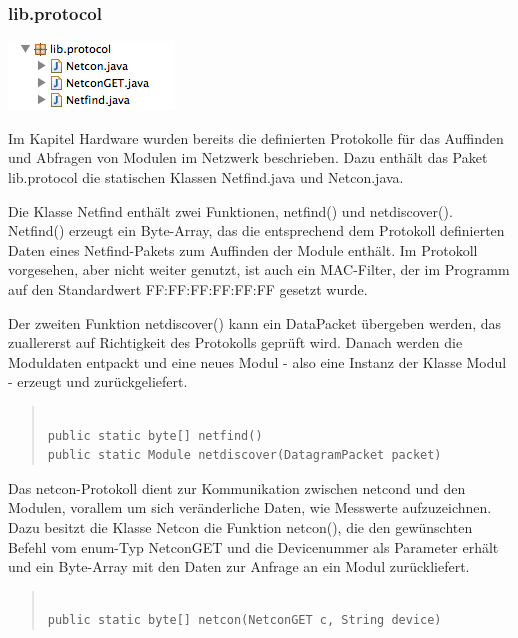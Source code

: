 \documentclass[a4paper,14pt,headsepline]{scrartcl}
\begin{document}
\subsubsection*{lib.protocol}

\includegraphics[width=0.2 \paperwidth]{./bilder/lib_protocol.png}

Im Kapitel Hardware wurden bereits die definierten Protokolle für das Auffinden und Abfragen von Modulen im Netzwerk beschrieben. Dazu enthält das Paket lib.protocol die statischen Klassen Netfind.java und Netcon.java. 

Die Klasse Netfind enthält zwei Funktionen, netfind() und netdiscover(). Netfind() erzeugt ein Byte-Array, das die entsprechend dem Protokoll definierten Daten eines Netfind-Pakets zum Auffinden der Module enthält. Im Protokoll vorgesehen, aber nicht weiter genutzt, ist auch ein MAC-Filter, der im Programm auf den Standardwert FF:FF:FF:FF:FF:FF gesetzt wurde. 

Der zweiten Funktion netdiscover() kann ein DataPacket übergeben werden, das zuallererst auf Richtigkeit des Protokolls geprüft wird. Danach werden die Moduldaten entpackt und eine neues Modul - also eine Instanz der Klasse Modul - erzeugt und zurückgeliefert.

\begin{quote}
\begin{verbatim}

public static byte[] netfind() 
public static Module netdiscover(DatagramPacket packet)

\end{verbatim}
\end{quote}

\newpage
Das netcon-Protokoll dient zur Kommunikation zwischen netcond und den Modulen, vorallem um sich veränderliche Daten, wie Messwerte aufzuzeichnen. Dazu besitzt die Klasse Netcon die Funktion netcon(), die den gewünschten Befehl vom enum-Typ NetconGET und die Devicenummer als Parameter erhält und ein Byte-Array mit den Daten zur Anfrage an ein Modul zurückliefert. 

\begin{quote}
\begin{verbatim}

public static byte[] netcon(NetconGET c, String device)

\end{verbatim}
\end{quote}
\end{document}
